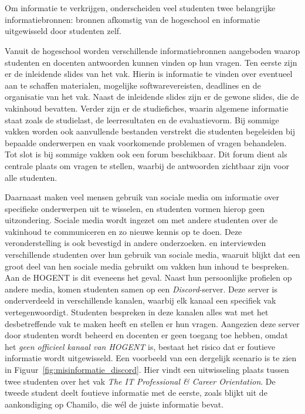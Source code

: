 \chapter{}%
\label{ch:literatuurstudie}

\section{}%
\label{sec:state-of-the-art}

Om informatie te verkrijgen, onderscheiden veel studenten twee belangrijke informatiebronnen: bronnen afkomstig van de hogeschool en informatie uitgewisseld door studenten zelf.

Vanuit de hogeschool worden verschillende informatiebronnen aangeboden waarop studenten en docenten antwoorden kunnen vinden op hun vragen. Ten eerste zijn er de inleidende slides van het vak. Hierin is informatie te vinden over eventueel aan te schaffen materialen, mogelijke softwarevereisten, deadlines en de organisatie van het vak. Naast de inleidende slides zijn er de gewone slides, die de vakinhoud bevatten. Verder zijn er de studiefiches, waarin algemene informatie staat zoals de studielast, de leerresultaten en de evaluatievorm. Bij sommige vakken worden ook aanvullende bestanden verstrekt die studenten begeleiden bij bepaalde onderwerpen en vaak voorkomende problemen of vragen behandelen. Tot slot is bij sommige vakken ook een forum beschikbaar. Dit forum dient als centrale plaats om vragen te stellen, waarbij de antwoorden zichtbaar zijn voor alle studenten.

Daarnaast maken veel mensen gebruik van sociale media om informatie over specifieke onderwerpen uit te wisselen, en studenten vormen hierop geen uitzondering. Sociale media wordt ingezet om met andere studenten over de vakinhoud te communiceren en zo nieuwe kennis op te doen. Deze veronderstelling is ook bevestigd in andere onderzoeken. \textcite{M.Talaue2018} en \textcite{Bal2017} interviewden verschillende studenten over hun gebruik van sociale media, waaruit blijkt dat een groot deel van hen sociale media gebruikt om vakken hun inhoud te bespreken. Aan de HOGENT is dit eveneens het geval. Naast hun persoonlijke profielen op andere media, komen studenten samen op een \emph{Discord}-server. Deze server is onderverdeeld in verschillende kanalen, waarbij elk kanaal een specifiek vak vertegenwoordigt. Studenten bespreken in deze kanalen alles wat met het desbetreffende vak te maken heeft en stellen er hun vragen. Aangezien deze server door studenten wordt beheerd en docenten er geen toegang toe hebben, omdat het \emph{geen officieel kanaal van HOGENT} is, bestaat het risico dat er foutieve informatie wordt uitgewisseld. Een voorbeeld van een dergelijk scenario is te zien in Figuur~\ref{fig:misinformatie_discord}. Hier vindt een uitwisseling plaats tussen twee studenten over het vak \emph{The IT Professional \& Career Orientation}. De tweede student deelt foutieve informatie met de eerste, zoals blijkt uit de aankondiging op Chamilo, die wél de juiste informatie bevat.

